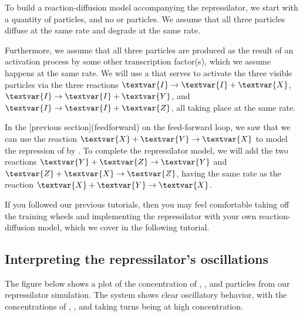 To build a reaction-diffusion model accompanying the repressilator, we start with a quantity of  particles, and no  or  particles. We assume that all three particles diffuse at the same rate and degrade at the same rate.

Furthermore, we assume that all three particles are produced as the result of an activation process by some other transcription factor(s), which we assume happens at the same rate. We will use a   that serves to activate the three visible particles via the three reactions $\textvar{I} \rightarrow \textvar{I} + \textvar{X}$, $\textvar{I} \rightarrow \textvar{I} + \textvar{Y}$, and $\textvar{I} \rightarrow \textvar{I} + \textvar{Z}$, all taking place at the same rate.

In the [previous section](feedforward) on the feed-forward loop, we saw that we can use the reaction $\textvar{X} + \textvar{Y} \rightarrow \textvar{X}$ to model the repression of  by . To complete the repressilator model, we will add the two reactions $\textvar{Y} + \textvar{Z} \rightarrow \textvar{Y}$ and $\textvar{Z} + \textvar{X} \rightarrow \textvar{Z}$, having the same rate as the reaction $\textvar{X} + \textvar{Y} \rightarrow \textvar{X}$.

If you followed our previous tutorials, then you may feel comfortable taking off the training wheels and implementing the repressilator with your own reaction-diffusion model, which we cover in the following tutorial.


\FloatBarrier
{}
\subsection{Interpreting the repressilator's oscillations}

The figure below shows a plot of the concentration of , , and  particles from our repressilator simulation. The system shows clear oscillatory behavior, with the concentrations of , , and  taking turns being at high concentration.\\

\begin{qbox}\end{qbox} 

